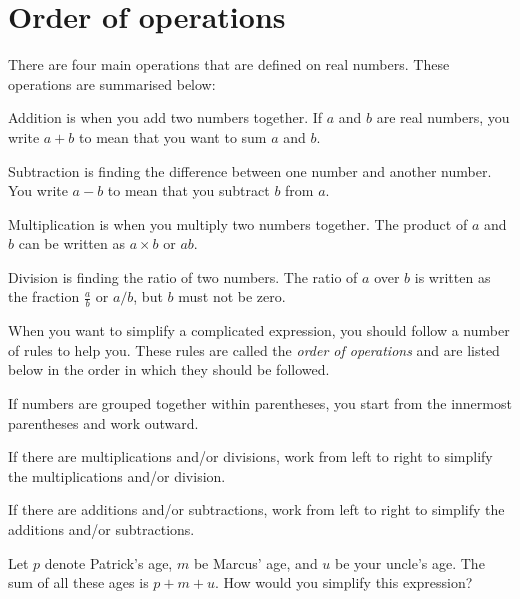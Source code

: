 \documentclass[a4paper,oneside,12pt]{article}
\begin{document}

\section{Order of operations}

There are four main operations that are defined on real numbers.
These operations are summarised below:
\begin{packedenumeral}
\item Addition is when you add two numbers together.  If $a$ and $b$
  are real numbers, you write $a + b$ to mean that you want to sum $a$
  and $b$.

\item Subtraction is finding the difference between one number and
  another number.  You write $a - b$ to mean that you subtract $b$
  from $a$.

\item Multiplication is when you multiply two numbers together.  The
  product of $a$ and $b$ can be written as $a \times b$ or $ab$.

\item Division is finding the ratio of two numbers.  The ratio of $a$
  over $b$ is written as the fraction $\frac{a}{b}$ or $a/b$, but $b$
  must not be zero.
\end{packedenumeral}

When you want to simplify a complicated expression, you should follow
a number of rules to help you.  These rules are called the
\emph{order of operations} and are listed below in the order in which
they should be followed.
\begin{packedenumeral}
\item If numbers are grouped together within parentheses, you start
  from the innermost parentheses and work outward.

\item If there are multiplications and/or divisions, work from left to
  right to simplify the multiplications and/or division.

\item If there are additions and/or subtractions, work from left to
  right to simplify the additions and/or subtractions.
\end{packedenumeral}

\begin{exercise}
Let $p$ denote Patrick's age, $m$ be Marcus' age, and $u$ be your
uncle's age.  The sum of all these ages is $p + m + u$.  How would you
simplify this expression?
\end{exercise}
\end{document}
